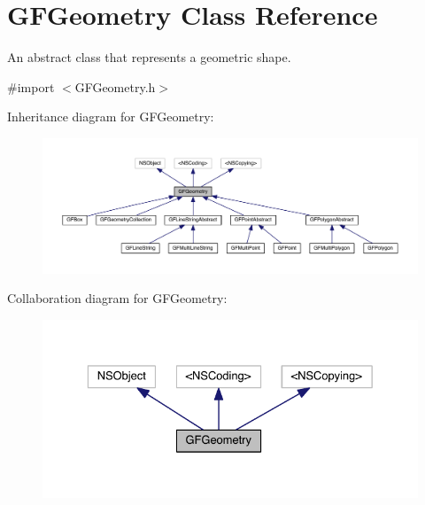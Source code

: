 \hypertarget{interface_g_f_geometry}{}\section{G\+F\+Geometry Class Reference}
\label{interface_g_f_geometry}


An abstract class that represents a geometric shape.  




{\ttfamily \#import $<$G\+F\+Geometry.\+h$>$}



Inheritance diagram for G\+F\+Geometry\+:\nopagebreak
\begin{figure}[H]
\begin{center}
\leavevmode
\includegraphics[width=350pt]{interface_g_f_geometry__inherit__graph}
\end{center}
\end{figure}


Collaboration diagram for G\+F\+Geometry\+:\nopagebreak
\begin{figure}[H]
\begin{center}
\leavevmode
\includegraphics[width=329pt]{interface_g_f_geometry__coll__graph}
\end{center}
\end{figure}
